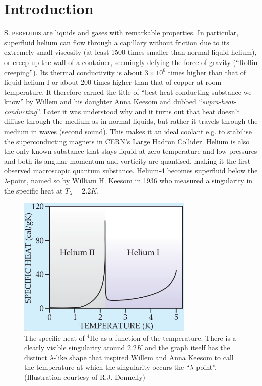 \chapter{Introduction}
	\lettrine[lines=4,findent=3pt,nindent=0pt]{\color{niceBlue1}S}{uperfluids} are liquids and gases with remarkable properties. In particular, superfluid helium can flow through a capillary without friction due to its extremely small viscosity (at least 1500 times smaller than normal liquid helium\citep{Kapitza1938}), or creep up the wall of a container, seemingly defying the force of gravity\citep{Rollin1939} (``Rollin creeping''). Its thermal conductivity is about $3\times10^6$ times higher than that of liquid helium I or about 200 times higher than that of copper at room temperature\citep{Keesom1936}. It therefore earned the title of ``best heat conducting substance we know'' by Willem and his daughter Anna Keesom and dubbed ``\emph{supra-heat-conducting}''\citep{Keesom1936}. Later it was understood why\citep{Tisza1938-1,Tisza1938-2,Tisza1940-1,Tisza1940-2} and it turns out that heat doesn't diffuse through the medium as in normal liquids, but rather it travels through the medium in waves (second sound). This makes it an ideal coolant e.g. to stabilise the superconducting magnets in CERN's Large Hadron Collider\citep{Lebrun1994}. Helium is also the only known substance that stays liquid at zero temperature and low pressures and both its angular momentum and vorticity are quantised, making it the first observed macroscopic quantum substance. Helium-4 becomes superfluid below the $\lambda$-point, named so by William H. Keesom in 1936 who measured a singularity in the specific heat at $T_\lambda=2.2\unit{K}$\citep{Keesom1936}.
	
	\begin{figure}[t]
		\begin{center}
			\includegraphics[width=0.75\textwidth]{specific-heat}
		\end{center}
		\caption{The specific heat of $^4$He as a function of the temperature. There is a clearly visible singularity around $2.2\unit{K}$ and the graph itself has the distinct $\lambda$-like shape that inspired\citep{Keesom1932} Willem and Anna Keesom to call the temperature at which the singularity occurs the ``$\lambda$-point''. (Illustration courtesy of R.J. Donnelly\citep{Donnelly2009})}
		\label{fig:specific-heat}
	\end{figure}	
	

